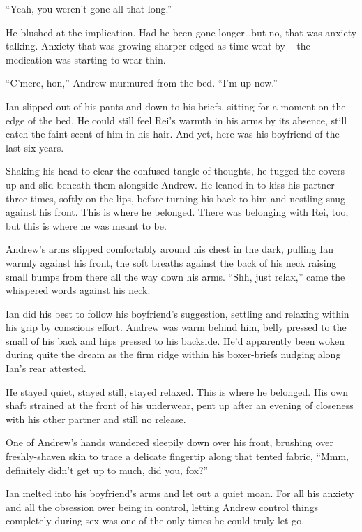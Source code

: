 \documentclass[12pt,letterpaper,oneside]{memoir}
\begin{document}
  ``Yeah, you weren't gone all that long.''

  He blushed at the implication. Had he been gone longer\ldots{}but no, that was anxiety talking. Anxiety that was growing sharper edged as time went by -- the medication was starting to wear thin.

  ``C'mere, hon,'' Andrew murmured from the bed. ``I'm up now.''

  Ian slipped out of his pants and down to his briefs, sitting for a moment on the edge of the bed. He could still feel Rei's warmth in his arms by its absence, still catch the faint scent of him in his hair. And yet, here was his boyfriend of the last six years.

  Shaking his head to clear the confused tangle of thoughts, he tugged the covers up and slid beneath them alongside Andrew. He leaned in to kiss his partner three times, softly on the lips, before turning his back to him and nestling snug against his front. This is where he belonged. There was belonging with Rei, too, but this is where he was meant to be.

  Andrew's arms slipped comfortably around his chest in the dark, pulling Ian warmly against his front, the soft breaths against the back of his neck raising small bumps from there all the way down his arms. ``Shh, just relax,'' came the whispered words against his neck.

  Ian did his best to follow his boyfriend's suggestion, settling and relaxing within his grip by conscious effort. Andrew was warm behind him, belly pressed to the small of his back and hips pressed to his backside. He'd apparently been woken during quite the dream as the firm ridge within his boxer-briefs nudging along Ian's rear attested.

  He stayed quiet, stayed still, stayed relaxed. This is where he belonged. His own shaft strained at the front of his underwear, pent up after an evening of closeness with his other partner and still no release.

  One of Andrew's hands wandered sleepily down over his front, brushing over freshly-shaven skin to trace a delicate fingertip along that tented fabric, ``Mmm, definitely didn't get up to much, did you, fox?''

  Ian melted into his boyfriend's arms and let out a quiet moan. For all his anxiety and all the obsession over being in control, letting Andrew control things completely during sex was one of the only times he could truly let go.
\end{document}
